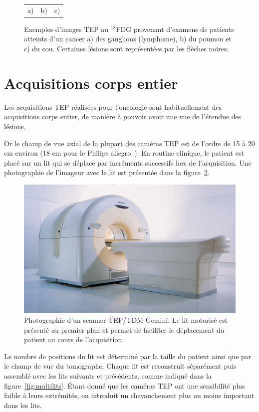 \begin{figure}[h!]
\begin{tabular}{c c c}
a) & b) & c)
\end{tabular}
\caption[Exemples d'images TEP]{Exemples d’images TEP au $^{18}$FDG provenant d’examens de patients atteints d’un cancer a) des ganglions (lymphome), b) du poumon et c) du cou. Certaines lésions sont représentées par les flèches noires.}
\label{fig:exTEP}
\end{figure}

\section{Acquisitions corps entier}


Les acquisitions TEP réalisées pour l'oncologie sont habituellement des acquisitions corps entier, de manière à pouvoir avoir une vue de l'étendue des lésions.

Or le champ de vue axial de la plupart des caméras TEP est de l'ordre de 15 à 20 cm environ (18 cm pour le Philips allegro~\cite{lamare2006validation}). En routine clinique, le patient est placé sur un lit qui se déplace par incréments successifs lors de l'acquisition. Une photographie de l'imageur avec le lit est présentée dans la figure~\ref{fig:photoGemini}.

\begin{figure}
\centering
\includegraphics[width=12cm]{images/gemini}
\caption[Photographie d'un scanner TEP gemini]{Photographie d'un scanner TEP/TDM Gemini. Le lit motorisé est présenté au premier plan et permet de faciliter le déplacement du patient au cours de l'acquisition.}
\label{fig:photoGemini}
\end{figure}

Le nombre de positions du lit est déterminé par la taille du patient ainsi que par le champ de vue du tomographe. Chaque lit est reconstruit séparément puis assemblé avec les lits suivants et précédents, comme indiqué dans la figure~\ref{fig:multilits}. \'Etant donné que les caméras TEP ont une sensibilité plus faible à leurs extrémités, on introduit un chevauchement plus ou moins important dans les lits.


